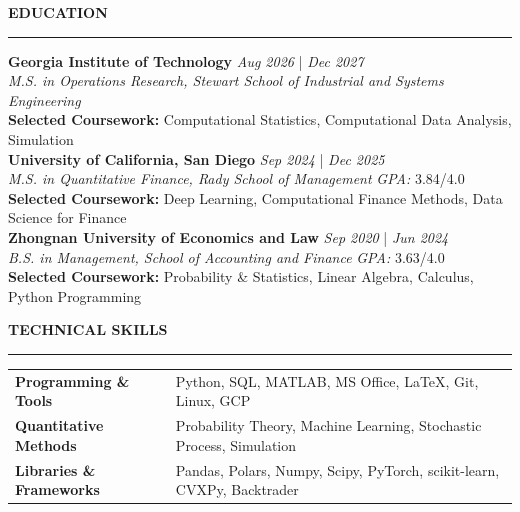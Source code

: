 \documentclass{resume} %
\renewcommand{\sectionskip}{\vspace{0.10cm}}        %
\renewcommand{\sectionlineskip}{\vspace{0.10cm}}
\renewenvironment{rSection}[1]{
\sectionskip
\textcolor{UC San Diego Blue}{\textbf{\large\bfseries\MakeUppercase{#1}}}

\sectionlineskip
\hrule
\begin{list}{}{
\setlength{\leftmargin}{0em}
}
\item[]
}{
\end{list}
}
\begin{document}
\thispagestyle{empty}

\begin{rSection}{EDUCATION}
{\bf Georgia Institute of Technology} \hfill {\em Aug 2026} | {\em Dec 2027}
\\ \textit{M.S. in Operations Research, Stewart School of Industrial and Systems Engineering} \hfill \textit{} \\
\textbf{Selected Coursework:} Computational Statistics, Computational Data Analysis, Simulation \\
{\bf University of California, San Diego} \hfill {\em Sep 2024} | {\em Dec 2025}
\\ \textit{M.S. in Quantitative Finance, Rady School of Management} \hfill \textit{GPA:} 3.84/4.0 \\
\textbf{Selected Coursework:} Deep Learning, Computational Finance Methods, Data Science for Finance \\
{\bf Zhongnan University of Economics and Law} \hfill {\em Sep 2020} | {\em Jun 2024}
\\ \textit{B.S. in Management, School of Accounting and Finance} \hfill \textit{GPA:} 3.63/4.0 \\
\textbf{Selected Coursework:} Probability \& Statistics, Linear Algebra, Calculus, Python Programming

\begin{rSection}{TECHNICAL SKILLS} \itemsep -2pt
\begin{tabularx}{\textwidth}{@{} >{\bfseries}l >{\raggedleft\arraybackslash}X @{}}
Programming \& Tools & Python, SQL, MATLAB, MS Office, \LaTeX, Git, Linux, GCP  \\
Quantitative Methods & Probability Theory, Machine Learning, Stochastic Process, Simulation \\
Libraries \& Frameworks  & Pandas, Polars, Numpy, Scipy, PyTorch, scikit-learn, CVXPy, Backtrader\\
\end{tabularx}
\end{rSection}


\end{rSection}
\end{document}
